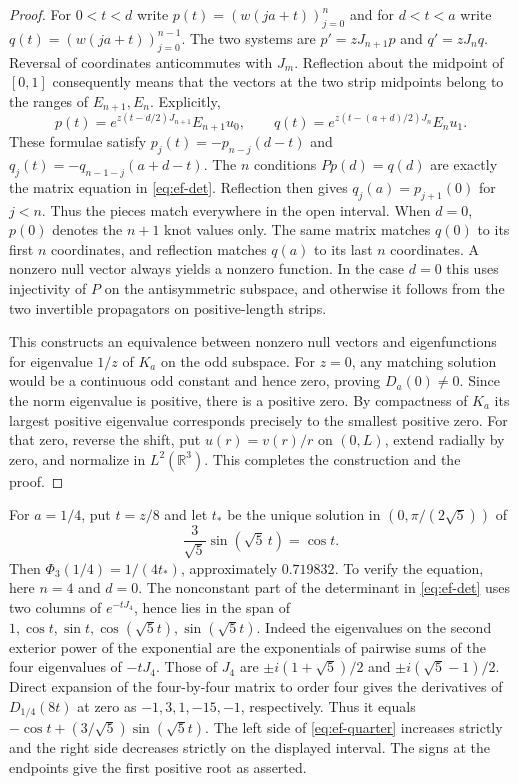 \documentclass[11pt,a4paper]{article}
\numberwithin{equation}{section}
\begin{document}
\begin{proof}
For $0<t<d$ write $p(t)=(w(ja+t))_{j=0}^{n}$ and for $d<t<a$ write $q(t)=(w(ja+t))_{j=0}^{n-1}$. The two systems are $p'=zJ_{n+1}p$ and $q'=zJ_nq$. Reversal of coordinates anticommutes with $J_m$. Reflection about the midpoint of $[0,1]$ consequently means that the vectors at the two strip midpoints belong to the ranges of $E_{n+1},E_n$. Explicitly,
\[
 p(t)=e^{z(t-d/2)J_{n+1}}E_{n+1}u_0,\qquad
 q(t)=e^{z(t-(a+d)/2)J_n}E_n u_1 .
\]
These formulae satisfy $p_j(t)=-p_{n-j}(d-t)$ and $q_j(t)=-q_{n-1-j}(a+d-t)$. The $n$ conditions $Pp(d)=q(d)$ are exactly the matrix equation in \eqref{eq:ef-det}. Reflection then gives $q_j(a)=p_{j+1}(0)$ for $j<n$. Thus the pieces match everywhere in the open interval. When $d=0$, $p(0)$ denotes the $n+1$ knot values only. The same matrix matches $q(0)$ to its first $n$ coordinates, and reflection matches $q(a)$ to its last $n$ coordinates. A nonzero null vector always yields a nonzero function. In the case $d=0$ this uses injectivity of $P$ on the antisymmetric subspace, and otherwise it follows from the two invertible propagators on positive-length strips.

This constructs an equivalence between nonzero null vectors and eigenfunctions for eigenvalue $1/z$ of $K_a$ on the odd subspace. For $z=0$, any matching solution would be a continuous odd constant and hence zero, proving $D_a(0)\ne0$. Since the norm eigenvalue is positive, there is a positive zero. By compactness of $K_a$ its largest positive eigenvalue corresponds precisely to the smallest positive zero. For that zero, reverse the shift, put $u(r)=v(r)/r$ on $(0,L)$, extend radially by zero, and normalize in $L^2(\mathbb R^3)$. This completes the construction and the proof.
\end{proof}

For $a=1/4$, put $t=z/8$ and let $t_*$ be the unique solution in $(0,\pi/(2\sqrt5))$ of
\begin{equation}
  \frac3{\sqrt5}\sin(\sqrt5\,t)=\cos t.
  \label{eq:ef-quarter}
\end{equation}
Then $\Phi_3(1/4)=1/(4t_*)$, approximately $0.719832$. To verify the equation, here $n=4$ and $d=0$. The nonconstant part of the determinant in \eqref{eq:ef-det} uses two columns of $e^{-tJ_4}$, hence lies in the span of $1,\cos t,\sin t,\cos(\sqrt5t),\sin(\sqrt5t)$. Indeed the eigenvalues on the second exterior power of the exponential are the exponentials of pairwise sums of the four eigenvalues of $-tJ_4$. Those of $J_4$ are $\pm i(1+\sqrt5)/2$ and $\pm i(\sqrt5-1)/2$. Direct expansion of the four-by-four matrix to order four gives the derivatives of $D_{1/4}(8t)$ at zero as $-1,3,1,-15,-1$, respectively. Thus it equals $-\cos t+(3/\sqrt5)\sin(\sqrt5t)$. The left side of \eqref{eq:ef-quarter} increases strictly and the right side decreases strictly on the displayed interval. The signs at the endpoints give the first positive root as asserted.
\end{document}
